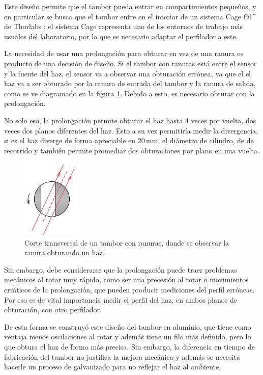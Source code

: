 Este diseño permite que el tambor pueda entrar en compartimientos pequeños, y en particular se busca que el tambor entre en el interior de un sistema Cage Ø1'' de Thorlabs \cite{thorlabs_cage}; el sistema Cage representa uno de los entornos de trabajo más usuales del laboratorio, por lo que es necesario adaptar el perfilador a este.

La necesidad de usar una prolongación para obturar en vez de una ranura es producto de una decisión de diseño. Si el tambor con ranuras está entre el sensor y la fuente del haz, el sensor va a observar una obturación errónea, ya que el el haz va a ser obturado por la ranura de entrada del tambor y la ranura de salida, como se ve diagramado en la figura \ref{fig:perfilador/tambor_ranuras}. Debido a esto, es necesario obturar con la prolongación.

No solo eso, la prolongación permite obturar el haz hasta 4 veces por vuelta, dos veces dos planos diferentes del haz. Esto a su vez permitiría medir la divergencia, si es el haz diverge de forma apreciable en 20$\,$mm, el diámetro de cilindro, de de recorrido y también permite promediar dos obturaciones por plano en una vuelta. 

\begin{figure}[H]
\centering
\includegraphics[width=0.25\textwidth]{fig/perfilador/tambor_ranuras}
\caption{Corte transversal de un tambor con ranuras, donde se observar la ranura obturando un haz.}
\label{fig:perfilador/tambor_ranuras}
\end{figure}

Sin embargo, debe considerarse que la prolongación puede traer problemas mecánicos al rotar muy rápido, como ser una precesión al rotar o movimientos erráticos de la prolongación, que pueden producir mediciones del perfil erróneas. Por eso es de vital importancia medir el perfil del haz, en ambos planos de obturación, con otro perfilador.

De esta forma se construyó este diseño del tambor en aluminio, que tiene como ventaja menos oscilaciones al rotar y además tiene un filo más definido, pero lo que obtura el haz de forma más precisa. Sin embargo, la diferencia en tiempo de fabricación del tambor no justifica la mejora mecánica y además se necesita hacerle un proceso de galvanizado para no reflejar el haz al ambiente.


